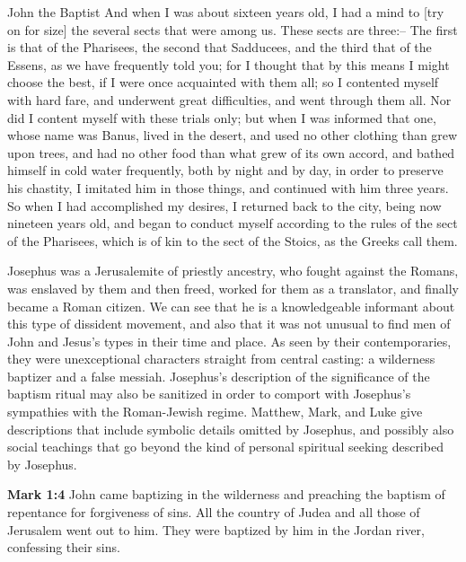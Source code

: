 \documentclass[10pt,a5paper,twoside]{article}
\newcommand{\quotesize}{\normalsize{}}
\newcommand{\comm}[1]{\begingroup \color{black!50} #1\endgroup}
\newenvironment{quotetext}{\begingroup\quotesize}{\endgroup}
\newcommand{\intex}[1]{\index[texts]{#1}}
\newcommand{\bible}[2]{\begin{quotetext}\textbf{#1}\intex{#1} #2\end{quotetext}}
\newcommand{\gospelmark}[2]{\bible{Mark #1}{#2}}
\begin{document}
\begin{section}{John the Baptist}
\begin{quotetext}
And when I was
about sixteen years old, I had a mind to [try on for size] the several sects
that were among us. These sects are three:-- The first is that of the
Pharisees, the second that Sadducees, and the third that of the Essens,
as we have frequently told you; for I thought that by this means I might
choose the best, if I were once acquainted with them all; so I contented
myself with hard fare, and underwent great difficulties, and went
through them all. Nor did I content myself with these trials only; but
when I was informed that one, whose name was Banus, lived in the desert,
and used no other clothing than grew upon trees, and had no other food
than what grew of its own accord, and bathed himself in cold water
frequently, both by night and by day, in order to preserve his chastity,
I imitated him in those things, and continued with him three years.
So when I had accomplished my desires, I returned back to the city,
being now nineteen years old, and began to conduct myself according to
the rules of the sect of the Pharisees, which is of kin to the sect of
the Stoics, as the Greeks call them.
\end{quotetext}


\comm{
Josephus was a Jerusalemite of priestly ancestry, who fought against the Romans,
was enslaved by them and then freed, worked for them as a translator, and finally became a Roman citizen.
We can see that he is a knowledgeable informant about this type of dissident movement, and also that it
was not unusual to find men of John and Jesus's types in their time and place. As seen by their contemporaries,
they were unexceptional characters straight from central casting: a wilderness baptizer and a false messiah.
Josephus's description of the significance of the baptism ritual may also be
sanitized in order to comport with Josephus's sympathies
with the Roman-Jewish regime. Matthew, Mark, and Luke give descriptions that include symbolic details omitted by Josephus,
and possibly also social teachings that go beyond the kind of personal spiritual seeking described by Josephus.
}

\gospelmark{1:4}{John came baptizing in the wilderness and preaching the
baptism of repentance for forgiveness of sins.  All the country of
Judea and all those of Jerusalem went out to him. They were baptized
by him in the Jordan river, confessing their sins.}


\end{section}
\end{document}
